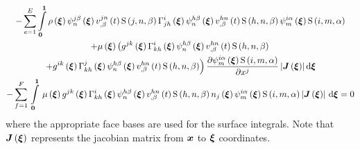 \begin{multline}
  -\dsuml{e=1}{E} \dintl{\vectr{0}}{\vectr{1}} \fnof{\rho}{\vectr{\xi}}
  \idxgbfn{j}{n}{\beta}{\vectr{\xi}}
  \fnof{\idxnodedof{v}{j}{n}{\beta}}{t}\idxgsf{j}{n}{\beta}\fnof{\christoffel{i}{j}{h}}{\vectr{\xi}}
  \idxgbfn{h}{n}{\beta}{\vectr{\xi}}\fnof{\idxnodedof{v}{h}{n}{\beta}}{t}\idxgsf{h}{n}{\beta}
  \idxgbfn{i}{m}{\alpha}{\vectr{\xi}}\idxgsf{i}{m}{\alpha}\\
  +\fnof{\mu}{\vectr{\xi}}\left(\fnof{g^{jk}}{\vectr{\xi}}\fnof{\christoffel{i}{k}{h}}{\vectr{\xi}}
    \idxgbfn{h}{n}{\beta}{\vectr{\xi}}
    \fnof{\idxnodedof{v}{h}{n}{\beta}}{t}\idxgsf{h}{n}{\beta}\right.\\
    \left.+\fnof{g^{ik}}{\vectr{\xi}}\fnof{\christoffel{j}{k}{h}}{\vectr{\xi}}\idxgbfn{h}{n}{\beta}{\vectr{\xi}}
    \fnof{\idxnodedof{v}{h}{n}{\beta}}{t}\idxgsf{h}{n}{\beta}\right)
    \delby{\idxgbfn{i}{m}{\alpha}{\vectr{\xi}}\idxgsf{i}{m}{\alpha}}{x^{j}}
    \abs{\fnof{\matr{J}}{\vectr{\xi}}}\exteriorderiv{\vectr{\xi}}\\
  -\gsum{f=1}{F}{\gint{\vectr{0}}{\vectr{1}}{\fnof{\mu}{\vectr{\xi}}
      \fnof{g^{jk}}{\vectr{\xi}}\fnof{\christoffel{i}{k}{h}}{\vectr{\xi}}\idxgbfn{h}{n}{\beta}{\vectr{\xi}}
      \fnof{\idxnodedof{v}{h}{n}{\beta}}{t}\idxgsf{h}{n}{\beta}\fnof{n_{j}}{\vectr{\xi}}
      \idxgbfn{i}{m}{\alpha}{\vectr{\xi}}\idxgsf{i}{m}{\alpha}\abs{\fnof{\matr{J}}{\vectr{\xi}}}}{\vectr{\xi}}}
  =0
  \label{eqn:FEM4NSE}
\end{multline}
where the appropriate face bases are used for the surface integrals. Note that
$\fnof{\matr{J}}{\vectr{\xi}}$ represents the jacobian matrix from $ \boldsymbol{x} $
to $ \boldsymbol{\xi} $ coordinates.

